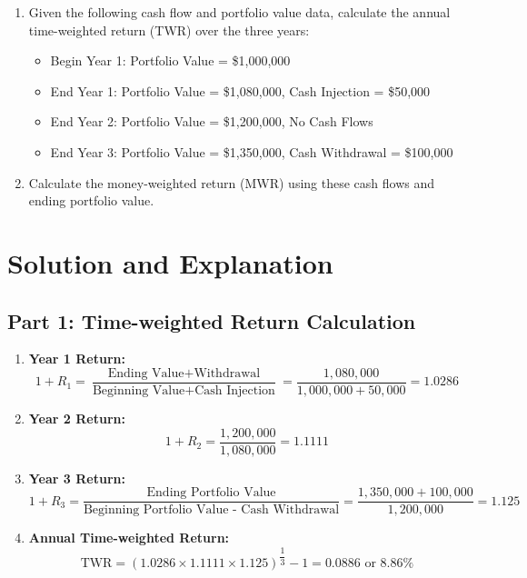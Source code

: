 \begin{enumerate}
    \item Given the following cash flow and portfolio value data, calculate the annual time-weighted return (TWR) over the three years:
    
    \begin{itemize}
        \item Begin Year 1: Portfolio Value = \$1,000,000
        \item End Year 1: Portfolio Value = \$1,080,000, Cash Injection = \$50,000
        \item End Year 2: Portfolio Value = \$1,200,000, No Cash Flows
        \item End Year 3: Portfolio Value = \$1,350,000, Cash Withdrawal = \$100,000
    \end{itemize}
    
    \item Calculate the money-weighted return (MWR) using these cash flows and ending portfolio value.
\end{enumerate}

\section*{Solution and Explanation}

\subsection*{Part 1: Time-weighted Return Calculation}

\begin{enumerate}
    \item \textbf{Year 1 Return:}
    \[
    1+R_1 = \dfrac{\text{Ending Value} + \text{Withdrawal}}{\text{Beginning Value} + \text{Cash Injection}} = \dfrac{1,080,000}{1,000,000 + 50,000} = 1.0286
    \]
    
    \item \textbf{Year 2 Return:}
    \[
    1+R_2 = \dfrac{1,200,000}{1,080,000} = 1.1111
    \]
    
    \item \textbf{Year 3 Return:}
    \[
    1+R_3 = \dfrac{\text{Ending Portfolio Value}}{\text{Beginning Portfolio Value - Cash Withdrawal}} = \dfrac{1,350,000 + 100,000}{1,200,000} = 1.125
    \]
    
    \item \textbf{Annual Time-weighted Return:}
    \[
    \text{TWR} = \left(1.0286 \times 1.1111 \times 1.125\right)^{\dfrac{1}{3}} - 1 = 0.0886 \text{ or } 8.86\%
    \]
\end{enumerate}

